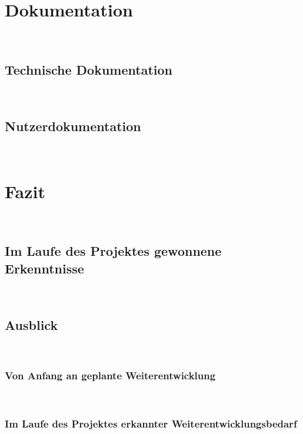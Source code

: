 \documentclass[11pt,toc=sectionentrywithoutdots, 
headheight=44pt, headings=optiontoheadandtoc, hyperfootnotes=false, hypertexnames=false]{scrartcl}
\begin{document}
\section{Dokumentation}
\blindtext\

\subsection{Technische Dokumentation}
\blindtext\

\subsection{Nutzerdokumentation}
\blindtext\

\section{Fazit}
\blindtext\

\subsection{Im Laufe des Projektes gewonnene Erkenntnisse}
\blindtext\

\subsection{Ausblick}
\blindtext\

\subsubsection{Von Anfang an geplante Weiterentwicklung}
\blindtext\

\subsubsection{Im Laufe des Projektes erkannter Weiterentwicklungsbedarf}
\blindtext\


\newpage
\setcounter{secnumdepth}{0}

{}

\printbibliography




\newpage


\setcounter{page}{1}
\setcounter{secnumdepth}{2}


\renewcommand{\thesection}{A}
\setcounter{section}{1}
\end{document}
